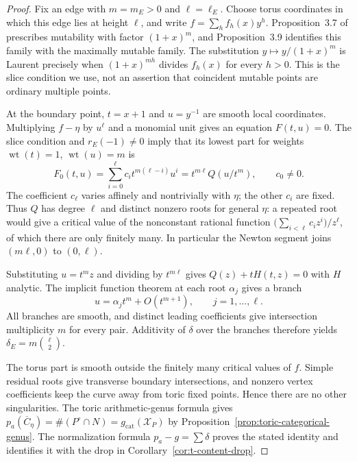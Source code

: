 \documentclass[11pt]{article}
\theoremstyle{plain}
\theoremstyle{definition}
\theoremstyle{remark}
\newcommand{\1}{\mathbf 1}
\begin{document}
\begin{proof}
Fix an edge with $m=m_E>0$ and $\ell=\ell_E$.  Choose torus coordinates in which this edge lies at height $\ell$, and write $f=\sum_h f_h(x)y^h$.  Proposition~3.7 of \cite{CKPT} prescribes mutability with factor $(1+x)^m$, and Proposition~3.9 identifies this family with the maximally mutable family.  The substitution $y\mapsto y/(1+x)^m$ is Laurent precisely when $(1+x)^{mh}$ divides $f_h(x)$ for every $h>0$.  This is the slice condition we use, not an assertion that coincident mutable points are ordinary multiple points.

At the boundary point, $t=x+1$ and $u=y^{-1}$ are smooth local coordinates.  Multiplying $f-\eta$ by $u^\ell$ and a monomial unit gives an equation $F(t,u)=0$.  The slice condition and $r_E(-1)\ne0$ imply that its lowest part for weights $\operatorname{wt}(t)=1$, $\operatorname{wt}(u)=m$ is
\[
F_0(t,u)=\sum_{i=0}^{\ell}c_i t^{m(\ell-i)}u^i
=t^{m\ell}Q(u/t^m),\qquad c_0\ne0.
\]
The coefficient $c_\ell$ varies affinely and nontrivially with $\eta$; the other $c_i$ are fixed.  Thus $Q$ has degree $\ell$ and distinct nonzero roots for general $\eta$: a repeated root would give a critical value of the nonconstant rational function $\bigl(\sum_{i<\ell}c_i z^i\bigr)/z^\ell$, of which there are only finitely many.  In particular the Newton segment joins $(m\ell,0)$ to $(0,\ell)$.

Substituting $u=t^mz$ and dividing by $t^{m\ell}$ gives $Q(z)+tH(t,z)=0$ with $H$ analytic.  The implicit function theorem at each root $\alpha_j$ gives a branch
\[
u=\alpha_jt^m+O(t^{m+1}),\qquad j=1,\ldots,\ell.
\]
All branches are smooth, and distinct leading coefficients give intersection multiplicity $m$ for every pair.  Additivity of $\delta$ over the branches therefore yields $\delta_E=m\binom\ell2$.

The torus part is smooth outside the finitely many critical values of $f$.  Simple residual roots give transverse boundary intersections, and nonzero vertex coefficients keep the curve away from toric fixed points.  Hence there are no other singularities.  The toric arithmetic-genus formula gives $p_a(\overline C_\eta)=\#(P^\circ\cap N)=g_{\mathrm{cat}}(\mathcal X_P)$ by Proposition~\ref{prop:toric-categorical-genus}.  The normalization formula $p_a-g=\sum\delta$ proves the stated identity and identifies it with the drop in Corollary~\ref{cor:t-content-drop}.
\end{proof}
\end{document}
